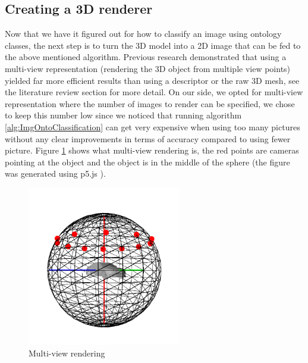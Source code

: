 \documentclass[a4paper,11pt,oneside]{article}
\begin{document}
  	\subsection{Creating a 3D renderer}
  	Now that we have it figured out for how to classify an image using ontology classes, the next step is to turn the 3D model into a 2D image that can be fed to the above mentioned algorithm. Previous research demonstrated that using a multi-view representation (rendering the 3D object from multiple view points)  yielded far more efficient results than using a descriptor or the raw 3D mesh, see the literature review section for more detail. On our side, we opted for multi-view representation where the number of images to render can be specified, we chose to keep this number low since we noticed that running algorithm \ref{alg:ImgOntoClassification} can get very expensive when using too many pictures without any clear improvements in terms of accuracy compared to using fewer picture. Figure \ref{fig:multicarp5} shows what multi-view rendering is, the red points are cameras pointing at the object and the object is in the middle of the sphere (the figure was generated using p5.js \cite{p5js}). 
  	\begin{figure}[h]
  	\centering
  	\includegraphics[width=0.6\textwidth]{figures/multiviewcar.png}
  	\caption{Multi-view rendering}
  	\label{fig:multicarp5}
  \end{figure}
\end{document}
